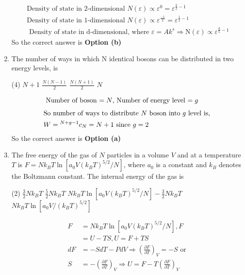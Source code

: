 \begin{enumerate}
\begin{answer}
\begin{align*}
	\text{Density of state in 2-dimensional $N(\varepsilon) \propto \varepsilon^{0}=\varepsilon^{\frac{2}{2}-1}$}\\
	\text{Density of state in 1-dimensional $N(\varepsilon) \propto \varepsilon^{\frac{-1}{2}}=\varepsilon^{\frac{1}{2}-1}$}\\
	\text{	Density of state in d-dimensional, where $\varepsilon=A k^{s} \Rightarrow \mathrm{N}(\varepsilon) \propto \varepsilon^{\frac{\mathrm{d}}{5}-1}$}
	\end{align*}
	So the correct answer is \textbf{Option (b)}
\end{answer}
	\item The number of ways in which $\mathrm{N}$ identical bosons can be distributed in two energy levels, is
	{}
	\begin{tasks}(4)
		\task[\textbf{a.}] $N+1$
		\task[\textbf{b.}] $\frac{N(N-1)}{2}$
		\task[\textbf{c.}] $\frac{N(N+1)}{2}$
		\task[\textbf{d.}] $N$
	\end{tasks}
\begin{answer}
	\begin{align*}
	\intertext{	Number of boson $=N$, Number of energy level $=g$}
	\intertext{So number of ways to distribute $N$ boson into $g$ level is, }
	W&={ }^{N+g-1} c_{N}=N+1\text{ since }g=2
	\end{align*}
	So the correct answer is \textbf{Option (a)}
\end{answer}
	\item The free energy of the gas of $N$ particles in a volume $V$ and at a temperature $T$ is $F=N k_{B} T \ln \left[a_{0} V\left(k_{B} T\right)^{5 / 2} / N\right]$, where $a_{0}$ is a constant and $k_{B}$ denotes the Boltzmann constant. The internal energy of the gas is
	{}
	\begin{tasks}(2)
		\task[\textbf{a.}] $\frac{3}{2} N k_{B} T$
		\task[\textbf{b.}] $\frac{5}{2} N k_{B} T$
		\task[\textbf{c.}] $N k_{B} T \ln \left[a_{0} V\left(k_{B} T\right)^{5 / 2} / N\right]-\frac{3}{2} N k_{B} T$
		\task[\textbf{d.}] $N k_{B} T \ln \left[a_{0} V /\left(k_{B} T\right)^{5 / 2}\right]$
	\end{tasks}
\begin{answer}
	\begin{align*}
	F&=N k_{B} T \ln \left[a_{0} V\left(k_{B} T\right)^{5 / 2} / N\right], F\\&=U-T S, U=F+T S\\
	d F&=-S d T-P d V \Rightarrow\left(\frac{\partial F}{\partial T}\right)_{V}=-S \text{ or } \\S&=-\left(\frac{\partial F}{\partial T}\right)_{V} \Rightarrow U=F-T\left(\frac{\partial F}{\partial T}\right)_{V}\\

\end{align*}
\end{answer}
\end{enumerate}
